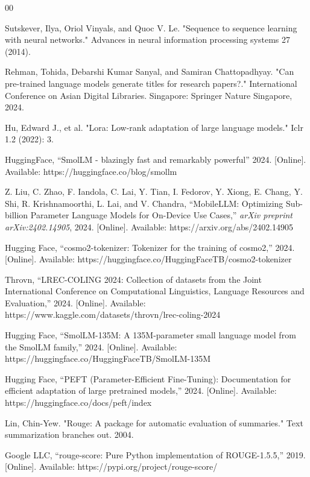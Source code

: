 \documentclass[12pt,conference]{IEEEtran}
\begin{document}
\begin{thebibliography}{00}

Sutskever, Ilya, Oriol Vinyals, and Quoc V. Le. "Sequence to sequence learning with neural networks." Advances in neural information processing systems 27 (2014).

Rehman, Tohida, Debarshi Kumar Sanyal, and Samiran Chattopadhyay. "Can pre-trained language models generate titles for research papers?." International Conference on Asian Digital Libraries. Singapore: Springer Nature Singapore, 2024.

Hu, Edward J., et al. 
"Lora: Low-rank adaptation of large language models." 
Iclr 1.2 (2022): 3.

HuggingFace,
``SmolLM - blazingly fast and remarkably powerful''
2024. [Online]. Available: https://huggingface.co/blog/smollm

Z. Liu, C. Zhao, F. Iandola, C. Lai, Y. Tian, I. Fedorov, Y. Xiong, E. Chang, Y. Shi, R. Krishnamoorthi, L. Lai, and V. Chandra,
``MobileLLM: Optimizing Sub-billion Parameter Language Models for On-Device Use Cases,''
\emph{arXiv preprint arXiv:2402.14905}, 2024. [Online]. Available: https://arxiv.org/abs/2402.14905

Hugging Face,
``cosmo2-tokenizer: Tokenizer for the training of cosmo2,''
2024. [Online]. Available: https://huggingface.co/HuggingFaceTB/cosmo2-tokenizer

Throvn,
``LREC-COLING 2024: Collection of datasets from the Joint International Conference on Computational Linguistics, Language Resources and Evaluation,''
2024. [Online]. Available: https://www.kaggle.com/datasets/throvn/lrec-coling-2024

Hugging Face,
``SmolLM-135M: A 135M-parameter small language model from the SmolLM family,''
2024. [Online]. Available: https://huggingface.co/HuggingFaceTB/SmolLM-135M

Hugging Face,
``PEFT (Parameter-Efficient Fine-Tuning): Documentation for efficient adaptation of large pretrained models,''
2024. [Online]. Available: https://huggingface.co/docs/peft/index

Lin, Chin-Yew. 
"Rouge: A package for automatic evaluation of summaries." Text summarization branches out. 2004.

Google LLC,
``rouge-score: Pure Python implementation of ROUGE-1.5.5,''
2019. [Online]. Available: https://pypi.org/project/rouge-score/
\end{thebibliography}
\vspace{12pt}
\end{document}
